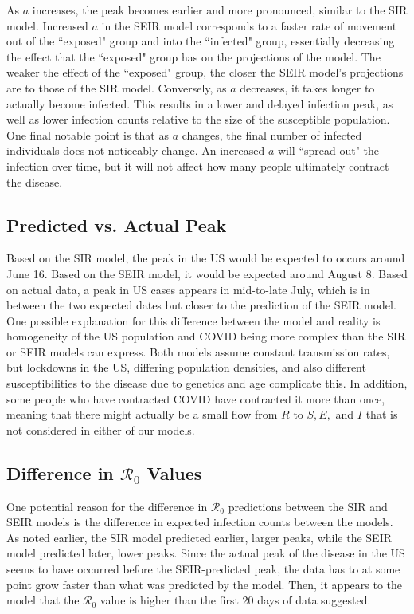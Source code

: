 \documentclass{article}
\newcommand{\rr}{\mathscr{R}_0}
\begin{document}
As $a$ increases, the peak becomes earlier and more pronounced, similar to the SIR model. Increased $a$ in the SEIR model corresponds to a faster rate of movement out of the ``exposed" group and into the ``infected" group, essentially decreasing the effect that the ``exposed" group has on the projections of the model. The weaker the effect of the ``exposed" group, the closer the SEIR model's projections are to those of the SIR model. Conversely, as $a$ decreases, it takes longer to actually become infected. This results in a lower and delayed infection peak, as well as lower infection counts relative to the size of the susceptible population. One final notable point is that as $a$ changes, the final number of infected individuals does not noticeably change. An increased $a$ will ``spread out" the infection over time, but it will not affect how many people ultimately contract the disease.


\subsection{Predicted vs. Actual Peak}

Based on the SIR model, the peak in the US would be expected to occurs around June 16. Based on the SEIR model, it would be expected around August 8. Based on actual data, a peak in US cases appears in mid-to-late July, which is in between the two expected dates but closer to the prediction of the SEIR model. One possible explanation for this difference between the model and reality is homogeneity of the US population and COVID being more complex than the SIR or SEIR models can express. Both models assume constant transmission rates, but lockdowns in the US, differing population densities, and also different susceptibilities to the disease due to genetics and age complicate this. In addition, some people who have contracted COVID have contracted it more than once, meaning that there might actually be a small flow from $R$ to $S, E,$ and $I$ that is not considered in either of our models.


\subsection{Difference in $\rr$ Values}

One potential reason for the difference in $\rr$ predictions between the SIR and SEIR models is the difference in expected infection counts between the models. As noted earlier, the SIR model predicted earlier, larger peaks, while the SEIR model predicted later, lower peaks. Since the actual peak of the disease in the US seems to have occurred before the SEIR-predicted peak, the data has to at some point grow faster than what was predicted by the model. Then, it appears to the model that the $\rr$ value is higher than the first 20 days of data suggested.
\end{document}
